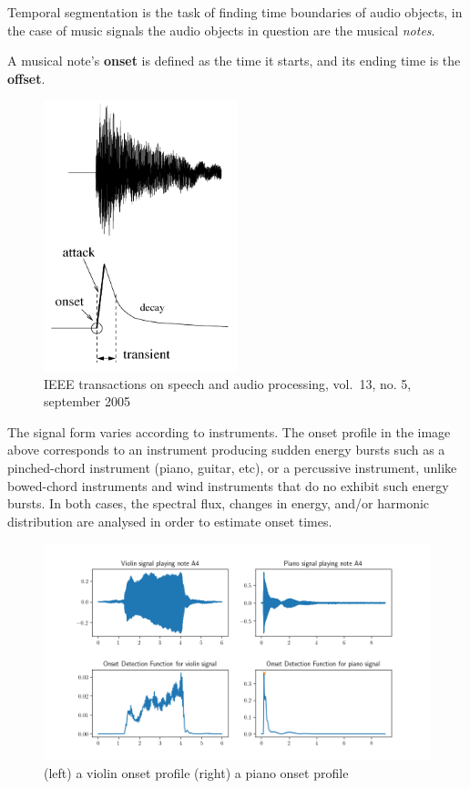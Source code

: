 \documentclass[
  american,
]{article}
\begin{document}
Temporal segmentation is the task of finding time boundaries
of audio objects, in the case of music signals the audio
objects in question are the musical \emph{notes}.

A musical note's \textbf{onset} is defined as the time it starts,
and its ending time is the \textbf{offset}.

\begin{figure}
\centering
\includegraphics[width=0.5\textwidth,height=\textheight]{img/onset.png}
\caption{IEEE transactions on speech and audio processing, vol.~13, no. 5, september 2005}
\end{figure}

The signal form varies according to instruments.
The onset profile in the image above corresponds to
an instrument producing sudden energy bursts such as
a pinched-chord instrument (piano, guitar, etc),
or a percussive instrument,
unlike bowed-chord instruments and wind instruments
that do no exhibit such energy bursts.
In both cases, the spectral flux, changes in energy,
and/or harmonic distribution are analysed in order
to estimate onset times.

\begin{figure}
\centering
\includegraphics{plot/onset_profiles.png}
\caption{(left) a violin onset profile (right) a piano onset profile}
\end{figure}
\end{document}
